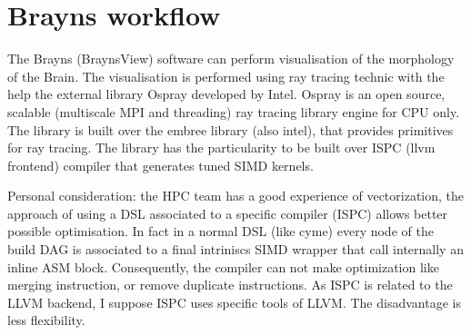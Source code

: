 \documentclass[11pt]{amsart}
\begin{document}
\section{Brayns workflow}

The Brayns  (BraynsView) software can perform visualisation of the morphology of the Brain. The visualisation is performed using ray tracing technic with the help
the external library Ospray developed by Intel. Ospray is an open source, scalable (multiscale MPI and threading) ray  tracing library engine for CPU only. The library
is built over the embree library (also intel), that provides primitives for ray tracing. The library has the particularity to be built over ISPC (llvm frontend) compiler that generates 
tuned SIMD kernels.  

Personal consideration: the HPC team has a good experience of vectorization, the approach  of using a DSL associated to a specific compiler (ISPC) allows better possible optimisation.
In fact in a normal DSL (like cyme) every node of the build DAG is associated to a final intriniscs SIMD wrapper that call internally an inline ASM block. Consequently, the compiler
can not make optimization like merging instruction, or remove duplicate instructions.  As ISPC is related to the LLVM backend, I suppose ISPC  uses specific tools of LLVM. The disadvantage is less flexibility.
\end{document}
